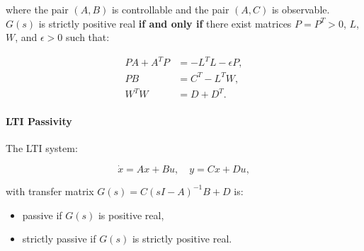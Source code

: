 where the pair $(A, B)$ is controllable and the pair $(A, C)$ is observable.
\newpar{}
$G(s)$ is strictly positive real \textbf{if and only if} there exist matrices $P = P^T > 0$, $L$, $W$, and $\epsilon > 0$ such that:

\begin{align*}
    PA + A^T P & = -L^T L - \epsilon P, \\
    PB         & = C^T - L^T W,         \\
    W^T W      & = D + D^T.
\end{align*}

\paragraph{LTI Passivity}

The LTI system:

\begin{equation*}
    \dot{x} = Ax + Bu, \quad y = Cx + Du,
\end{equation*}

with transfer matrix $G(s) = C(sI - A)^{-1}B + D$ is:

\begin{itemize}
    \item passive if $G(s)$ is positive real,
    \item strictly passive if $G(s)$ is strictly positive real.
\end{itemize}



